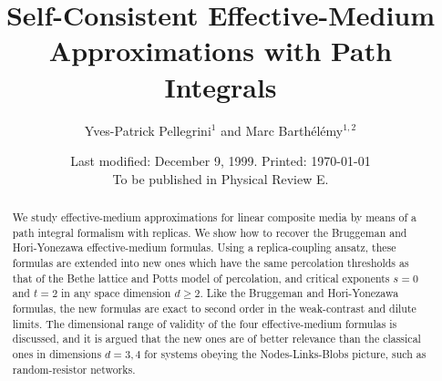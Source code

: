 
\newcommand{\sigmabf}{\text{\boldmath$\sigma$}}
\newcommand{\Sigmasf}{{\mathsf\Sigma}}
\newcommand{\nablabf}{\text{\boldmath$\nabla$}}
\newcommand{\lambdabf}{\text{\boldmath$\lambda$}}
\newcommand{\dbf}{\text{\boldmath$d$}}
\newcommand{\iu}{\underline{i}}
\newcommand{\ju}{\underline{j}}
\newcommand{\be}{\begin{equation}}
\newcommand{\ee}{\end{equation}}
\newcommand{\ddx}{d^d\! x\,}



\draft

\title{Self-Consistent Effective-Medium Approximations with Path Integrals}

\author{Yves-Patrick Pellegrini$^1$ and Marc Barth\'el\'emy$^{1,2}$}

\address{ $^1$ Service de Physique de la Mati\`ere Condens\'ee, \\
		Commissariat \`a l'Energie Atomique,\\
		BP12, 91680 Bruy\`eres-le-Ch\^atel, France.\\
	  $^2$ Center for Polymer Studies and Dept. of Physics,
		Boston University, Boston, MA 02215.}

\date{Last modified: December 9, 1999. Printed: \today\\
To be published in Physical Review E.}

\maketitle

\begin{abstract}
We study effective-medium approximations for linear composite media
by means of a path integral formalism with replicas. 
We show how to recover the Bruggeman
and Hori-Yonezawa effective-medium formulas. 
Using a replica-coupling ansatz, 
these formulas are extended into new ones
which have the same percolation thresholds as that of the Bethe 
lattice and Potts model of percolation, 
and critical exponents $s=0$
and $t=2$ in any space dimension $d\geq 2$. 
Like the Bruggeman and Hori-Yonezawa formulas, the new formulas 
are exact to second order in the weak-contrast and dilute limits. 
The dimensional range of validity of the four effective-medium 
formulas is discussed, and it is argued that the new ones are 
of better relevance than the classical ones in dimensions $d=3,4$ 
for systems obeying the Nodes-Links-Blobs picture, such as 
random-resistor networks.
\end{abstract}


